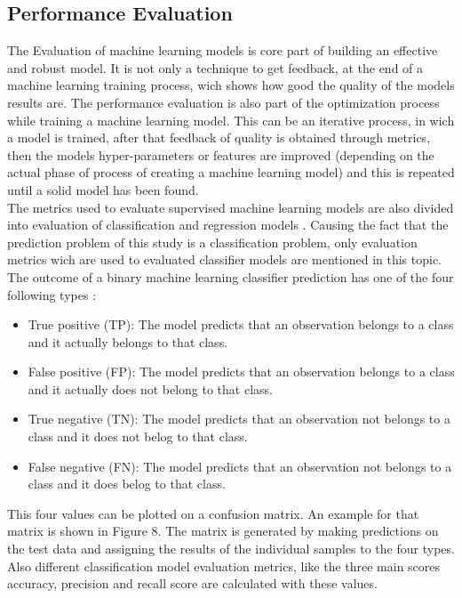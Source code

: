 \documentclass[../masterarbeit.tex]{subfiles}
\begin{document}
	



\subsection{Performance Evaluation}
The Evaluation of machine learning models is core part of building an effective and robust model. It is not only a technique to get feedback, at the end of a machine learning training process, wich shows how good the quality of the models results are. The performance evaluation is also part of the optimization process while training a machine learning model. This can be an iterative process, in wich a model is trained, after that feedback of quality is obtained through metrics, then the models hyper-parameters or features are improved (depending on the actual phase of process of creating a machine learning model) and this is repeated until a solid model has been found. \autocite[]{analyticsvidhya_evaluation:2022} \\
The metrics used to evaluate supervised machine learning models are also divided into evaluation of classification and regression models \textcite[]{jeremyjordan_evaluation:2022}. Causing the fact that the prediction problem of this study is a classification problem, only evaluation metrics wich are used to evaluated classifier models are mentioned in this topic. \\
The outcome of a binary machine learning classifier prediction has one of the four following types \textcite[]{jeremyjordan_evaluation:2022}:
\begin{itemize}
	\item True positive (TP): The model predicts that an observation belongs to a class and it actually belongs to that class.
	\item False positive (FP): The model predicts that an observation belongs to a class and it actually does not belong to that class.
	\item True negative (TN): The model predicts that an observation not belongs to a class and it does not belog to that class.
	\item False negative (FN): The model predicts that an observation not belongs to a class and it does belog to that class.
\end{itemize} 
This four values can be plotted on a confusion matrix. An example for that matrix is shown in Figure 8. The matrix is generated by making predictions on the test data and assigning the results of the individual samples to the four types. Also different classification model evaluation metrics, like the three main scores accuracy, precision and recall score are calculated with these values. \autocite[]{jeremyjordan_evaluation:2022}
\end{document}
